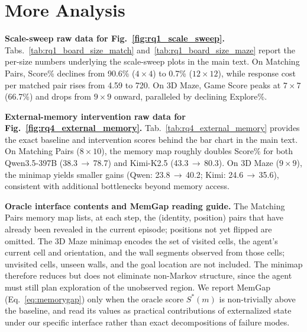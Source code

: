 \documentclass{llmxive}
\begin{document}
\section{More Analysis} \label{sec:appendix_ablation}

\noindent\textbf{Scale-sweep raw data for Fig.~\ref{fig:rq1_scale_sweep}.}
Tabs.~\ref{tab:rq1_board_size_match} and~\ref{tab:rq1_board_size_maze} report the per-size numbers underlying the scale-sweep plots in the main text. On Matching Pairs, Score\% declines from 90.6\% ($4{\times}4$) to 0.7\% ($12{\times}12$), while response cost per matched pair rises from 4.59 to 720. On 3D Maze, Game Score peaks at $7{\times}7$ (66.7\%) and drops from $9{\times}9$ onward, paralleled by declining Explore\%.



\noindent\textbf{External-memory intervention raw data for Fig.~\ref{fig:rq4_external_memory}.}
Tab.~\ref{tab:rq4_external_memory} provides the exact baseline and intervention scores behind the bar chart in the main text. On Matching Pairs ($8{\times}10$), the memory map roughly doubles Score\% for both Qwen3.5-397B (38.3\,$\to$\,78.7) and Kimi-K2.5 (43.3\,$\to$\,80.3). On 3D Maze ($9{\times}9$), the minimap yields smaller gains (Qwen: 23.8\,$\to$\,40.2; Kimi: 24.6\,$\to$\,35.6), consistent with additional bottlenecks beyond memory access.

\noindent\textbf{Oracle interface contents and MemGap reading guide.}
The Matching Pairs memory map lists, at each step, the (identity, position) pairs that have already been revealed in the current episode; positions not yet flipped are omitted. The 3D Maze minimap encodes the set of visited cells, the agent's current cell and orientation, and the wall segments observed from those cells; unvisited cells, unseen walls, and the goal location are not included. The minimap therefore reduces but does not eliminate non-Markov structure, since the agent must still plan exploration of the unobserved region. We report MemGap (Eq.~\ref{eq:memorygap}) only when the oracle score $S^*(m)$ is non-trivially above the baseline, and read its values as practical contributions of externalized state under our specific interface rather than exact decompositions of failure modes.
\end{document}
